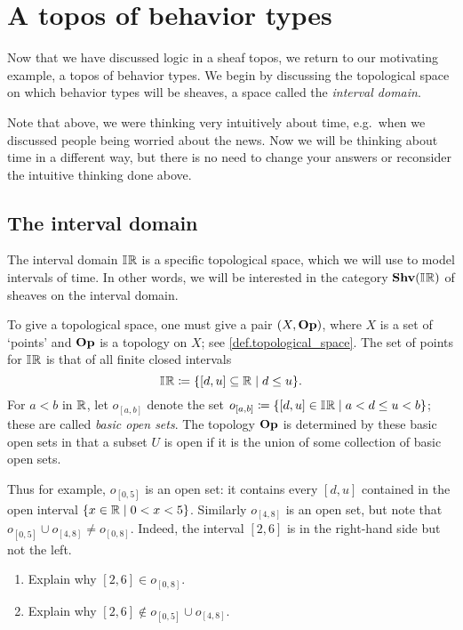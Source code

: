\documentclass[7Sketches]{subfiles}
\begin{document}
\section{A topos of behavior types}%
\label{subsec.topos_behavior_types}%

Now that we have discussed logic in a sheaf topos, we return to our motivating example, a topos of behavior types. We begin by discussing the topological space on which behavior types will be sheaves, a space called the \emph{interval domain}.%

\begin{remark}
Note that above, we were thinking very intuitively about time, e.g.\ when we discussed people being worried about the news. Now we will be thinking about time in a different way, but there is no need to change your answers or reconsider the intuitive thinking done above.
\end{remark}

\subsection{The interval domain}%
\label{subsec.IR}
%

The interval domain $\mathbb{I}\hspace{.6pt}\mathbb{R}$ is a specific topological space, which we will use to model intervals of time. In other words, we will be interested in the category $\mathbf{Shv}(\mathbb{I}\hspace{.6pt}\mathbb{R})$ of sheaves on the interval domain.%

To give a topological space, one must give a pair $(X,\mathbf{Op})$, where $X$ is a set of `points' and $\mathbf{Op}$ is a topology on $X$; see \cref{def.topological_space}. The set of points for $\mathbb{I}\hspace{.6pt}\mathbb{R}$ is that of all finite closed intervals
\[\mathbb{I}\hspace{.6pt}\mathbb{R}\coloneqq\{[d,u]\subseteq\mathbb{R}\mid d\leq u\}.\]
For $a<b$ in $\mathbb{R}$, let $o_{[a,b]}$ denote the set $o_{[a,b]}\coloneqq\{[d,u]\in\mathbb{I}\hspace{.6pt}\mathbb{R}\mid a<d\leq u<b\}$; these are called \emph{basic open sets}. The topology $\mathbf{Op}$ is determined by these basic open sets in that a subset $U$ is open if it is the union of some collection of basic open sets.

Thus for example, $o_{[0,5]}$ is an open set: it contains every $[d,u]$ contained in the open interval $\{x\in\mathbb{R}\mid 0<x<5\}$. Similarly $o_{[4,8]}$ is an open set, but note that $o_{[0,5]}\cup o_{[4,8]}\neq o_{[0,8]}$. Indeed, the interval $[2,6]$ is in the right-hand side but not the left.

\begin{exercise}%
\label{exc.explain_intervals}
\begin{enumerate}
	\item Explain why $[2,6]\in o_{[0,8]}$.
	\item Explain why $[2,6]\not\in o_{[0,5]}\cup o_{[4,8]}$.
\qedhere
\end{enumerate}
\end{exercise}
\end{document}

